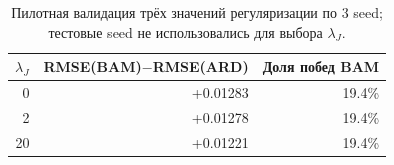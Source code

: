 \begin{table}[htbp]\centering
\caption{Пилотная валидация трёх значений регуляризации по 3 seed; тестовые seed не использовались для выбора $\lambda_J$.}
\label{tab:metric-pilot}
\begin{tabular}{rrr}
\toprule
$\lambda_J$ & RMSE(BAM)$-$RMSE(ARD) & Доля побед BAM \\
\midrule
0 & +0.01283 & 19.4\% \\
2 & +0.01278 & 19.4\% \\
20 & +0.01221 & 19.4\% \\
\bottomrule
\end{tabular}
\end{table}
